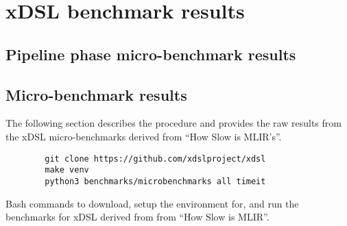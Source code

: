 \chapter{xDSL benchmark results}
\label{chap:xdsl-benchmark-results}

\section{Pipeline phase micro-benchmark results}

\section{Micro-benchmark results}

The following section describes the procedure and provides the raw results from the xDSL micro-benchmarks derived from ``How Slow is MLIR's''.

\vspace{2em}

\begin{code}
    \begin{verbatim}
        git clone https://github.com/xdslproject/xdsl
        make venv
        python3 benchmarks/microbenchmarks all timeit
    \end{verbatim}
    \caption{Bash commands to download, setup the environment for, and run the benchmarks for xDSL derived from from ``How Slow is MLIR''.}
    \label{listing:bash-xdsl-ubench-run}
\end{code}

\vspace{2em}

